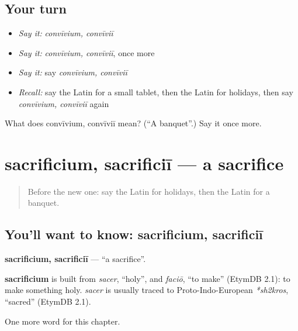 \subsection*{Your turn}
\begin{itemize}
\raggedright
  \item \emph{Say it:} \emph{convīvium, convīviī}
  \item \emph{Say it:} \emph{convīvium, convīviī}, once more
  \item \emph{Say it:} say \emph{convīvium, convīviī}
  \item \emph{Recall:} say the Latin for a small tablet, then the Latin for holidays, then say \emph{convīvium, convīviī} again
\end{itemize}

\begin{tcolorbox}[breakable,colback=teal!4,colframe=teal!35!black,title={Before you move on}]
What does convīvium, convīviī mean? (\textquotedblleft{}A banquet\textquotedblright{}.) Say it once more.
\end{tcolorbox}
\section[sacrificium, sacrificiī]{sacrificium, sacrificiī — a sacrifice}

\label{lesson:LA-C253-sacrificium}



\begin{quote}
Before the new one: say the Latin for holidays, then the Latin for a banquet.
\end{quote}

\subsection*{You'll want to know: sacrificium, sacrificiī}
\textbf{sacrificium, sacrificiī} — \textquotedblleft{}a sacrifice\textquotedblright{}.

\begin{cousinweb}
\textbf{sacrificium} is built from \emph{sacer}, \textquotedblleft{}holy\textquotedblright{}, and \emph{faciō}, \textquotedblleft{}to make\textquotedblright{} (EtymDB 2.1): to make something holy. \emph{sacer} is usually traced to Proto-Indo-European \emph{*sh2kros}, \textquotedblleft{}sacred\textquotedblright{} (EtymDB 2.1).
\end{cousinweb}

\begin{grammarlens}[title={What you've built}]
One more word for this chapter.
\end{grammarlens}

